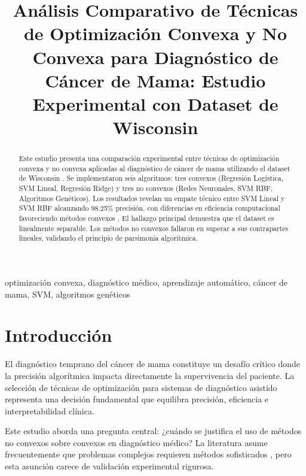 \documentclass[conference]{IEEEtran}
\begin{document}
\title{Análisis Comparativo de Técnicas de Optimización Convexa y No Convexa para Diagnóstico de Cáncer de Mama: Estudio Experimental con Dataset de Wisconsin}

\author{
}

\maketitle

\begin{abstract}
Este estudio presenta una comparación experimental entre técnicas de optimización convexa y no convexa aplicadas al diagnóstico de cáncer de mama utilizando el dataset de Wisconsin \cite{wolberg1995}. Se implementaron seis algoritmos: tres convexos (Regresión Logística, SVM Lineal, Regresión Ridge) y tres no convexos (Redes Neuronales, SVM RBF, Algoritmos Genéticos). Los resultados revelan un empate técnico entre SVM Lineal y SVM RBF alcanzando 98.25\% precisión, con diferencias en eficiencia computacional favoreciendo métodos convexos \cite{boyd2004}. El hallazgo principal demuestra que el dataset es linealmente separable. Los métodos no convexos fallaron en superar a sus contrapartes lineales, validando el principio de parsimonia algorítmica.
\end{abstract}

\begin{IEEEkeywords}
optimización convexa, diagnóstico médico, aprendizaje automático, cáncer de mama, SVM, algoritmos genéticos
\end{IEEEkeywords}

\section{Introducción}

El diagnóstico temprano del cáncer de mama constituye un desafío crítico donde la precisión algorítmica impacta directamente la supervivencia del paciente. La selección de técnicas de optimización para sistemas de diagnóstico asistido representa una decisión fundamental que equilibra precisión, eficiencia e interpretabilidad clínica.

Este estudio aborda una pregunta central: ¿cuándo se justifica el uso de métodos no convexos sobre convexos en diagnóstico médico? La literatura asume frecuentemente que problemas complejos requieren métodos sofisticados \cite{hastie2009}, pero esta asunción carece de validación experimental rigurosa.
\end{document}
